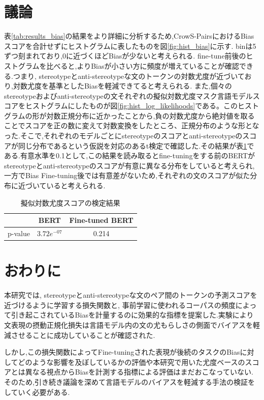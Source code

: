 \documentclass[
  platex, dvipdfmx %
]{nlp2021}
\begin{document}
\section{議論}
表\ref{tab:results_bias}の結果をより詳細に分析するため,CrowS-PairsにおけるBiasスコアを合計せずにヒストグラムに表したものを図\ref{fig:hist_bias}に示す. binは5ずつ刻まれており,0に近づくほどBiasが少ないと考えられる. fine-tune前後のヒストグラムを比べると,よりBiasが小さい方に頻度が増えていることが確認できる.つまり, stereotypeとanti-stereotypeな文のトークンの対数尤度が近づいており,対数尤度を基準としたBiasを軽減できてると考えられる.
また,個々のstereotypeおよびanti-stereotypeの文それぞれの擬似対数尤度マスク言語モデルスコアをヒストグラムにしたものが図\ref{fig:hist_log_likelihoods}である。このヒストグラムの形が対数正規分布に近かったことから,負の対数尤度から絶対値を取ることでスコアを正の数に変えて対数変換をしたところ、正規分布のような形となった.そこで,それぞれのモデルごとにstereotypeのスコアとanti-stereotypeのスコアが同じ分布であるという仮説を対応のあるt検定で確認した.その結果が表\ref{tab:t_bias_scores}である.有意水準を0.1として,この結果を読み取るとfine-tuningをする前のBERTがstereotypeとanti-stereotypeのスコアが有意に異なる分布をしていると考えられ,一方でBias Fine-tuning後では有意差がないため,それぞれの文のスコアが似た分布に近づいていると考えられる.

\begin{table}[h]
\centering
\begin{tabular}{lcc}
\hline
 &  BERT & Fine-tuned BERT \\
\hline
p-value & $3.72e^{-07}$ &  0.214 \\
\hline
\end{tabular}
\caption{擬似対数尤度スコアの検定結果}
\label{tab:t_bias_scores}
\end{table}

\section{おわりに}
本研究では, stereotypeとanti-stereotypeな文のペア間のトークンの予測スコアを近づけるように学習する損失関数と, 事前学習に使われるコーパスの頻度によって引き起こされているBiasを計量するのに効果的な指標を提案した.実験により文表現の摂動正規化損失は言語モデル内の文の尤もらしさの側面でバイアスを軽減させることに成功していることが確認された.

しかし,この損失関数によってFine-tuningされた表現が後続のタスクのBiasに対してどのような影響を及ぼしているかの評価や本研究で用いた尤度ベースのスコアとは異なる視点からBiasを計測する指標による評価はまだおこなっていない.そのため,引き続き議論を深めて言語モデルのバイアスを軽減する手法の検証をしていく必要がある.

\clearpage




\end{document}

